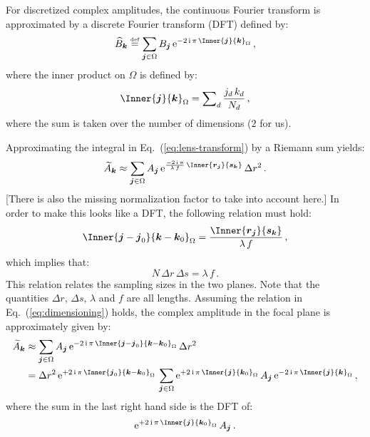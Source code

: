 \documentclass[a4paper,10pt,twocolumn]{scrartcl}
\newcommand{\oops}[1]{\textcolor[named]{BrickRed}{#1}}
\newcommand*{\mathe}{\mathrm{e}}
\newcommand*{\mathi}{\mathrm{i}}
\newcommand*{\bydef}{\stackrel{{\scriptscriptstyle \text{def}}}{=}}
\newcommand*{\FT}[1]{\widetilde{#1}}
\newcommand*{\DFT}[1]{\widehat{#1}}
\newcommand*{\V}[1]{\boldsymbol{#1}}   %
\begin{document}
For discretized complex amplitudes, the continuous Fourier transform is
approximated by a discrete Fourier transform (DFT) defined by:
\begin{equation}
  \DFT{B}_{\V k}
  \bydef \sum_{\V j \in \Omega}
  B_{\V j} \, \mathe^{-2\,\mathi\,\pi \, \Inner{\V j}{\V k}_{\Omega}} \, ,
  \label{eq:DFT}  
\end{equation}
where the inner product on $\Omega$ is defined by:
\begin{equation}
  \Inner{\V j}{\V k}_{\Omega} = \sum\nolimits_d \frac{j_d\,k_d}{N_d} \, ,
\end{equation}
where the sum is taken over the number of dimensions ($2$ for us).

Approximating the integral in Eq.~(\ref{eq:lens-transform}) by a Riemann sum yields:
\begin{equation}
  \FT{A}_{\V k} \approx \sum_{\V j \in \Omega} A_{\V j} \, \mathe^{\frac{-2\,\mathi\,\pi}{\lambda\,f}\,\Inner{\V r_{\V j}}{\V s_{\V k}}} \,
  \Delta r^2 \, .
  \label{eq:Riemann-approx}
\end{equation}
\oops{[There is also the missing normalization factor to take into account here.]}
In order to make this looks like a DFT, the following relation must hold:
\begin{displaymath}
  \Inner{\V j - \V j_0}{\V k - \V k_0}_{\Omega}
  = \frac{\Inner{\V r_{\V j}}{\V s_{\V k}}}{\lambda\,f} \, ,
  \label{eq:dimensioning}
\end{displaymath}
which implies that:
\begin{equation}
  N\,\Delta r\,\Delta s = \lambda\,f \, .
\end{equation}
This relation relates the sampling sizes in the two planes.  Note that the
quantities $\Delta r$, $\Delta s$, $\lambda$ and $f$ are all lengths.
Assuming the relation in Eq.~(\ref{eq:dimensioning}) holds, the complex
amplitude in the focal plane is approximately given by:
\begin{align}
  \FT{A}_{\V k}
  &\approx \sum_{\V j \in \Omega} A_{\V j} \,
  \mathe^{-2\,\mathi\,\pi \, \Inner{\V j - \V j_0}{\V k - \V k_0}_{\Omega}} \,
  \Delta r^2 \notag\\
  &= \Delta r^2 \,
  \mathe^{+2\,\mathi\,\pi \, \Inner{\V j_0}{\V k - \V k_0}_{\Omega}} \,
  \sum_{\V j \in \Omega}
  \mathe^{+2\,\mathi\,\pi \, \Inner{\V j}{\V k_0}_{\Omega}} \, A_{\V j} \, \mathe^{-2\,\mathi\,\pi \, \Inner{\V j}{\V k}_{\Omega}} \, ,  
\end{align}
where the sum in the last right hand side is the DFT of:
\begin{displaymath}
  \mathe^{+2\,\mathi\,\pi \, \Inner{\V j}{\V k_0}_{\Omega}} \, A_{\V j} \, .
\end{displaymath}
\end{document}
